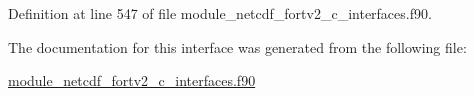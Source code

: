 Definition at line 547 of file module\+\_\+netcdf\+\_\+fortv2\+\_\+c\+\_\+interfaces.\+f90.



The documentation for this interface was generated from the following file\+:\begin{DoxyCompactItemize}
\item 
\hyperlink{module__netcdf__fortv2__c__interfaces_8f90}{module\+\_\+netcdf\+\_\+fortv2\+\_\+c\+\_\+interfaces.\+f90}\end{DoxyCompactItemize}
